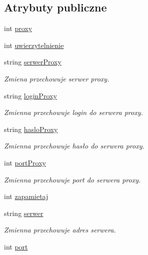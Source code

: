 \subsection*{Atrybuty publiczne}
\begin{CompactItemize}
\item 
int \hyperlink{a00001_2be9fdb760f0ef82c0bfd65a6867c1fb}{proxy}
\item 
int \hyperlink{a00001_4b253df312924aa3a59d44df86116f92}{uwierzytelnienie}
\item 
string \hyperlink{a00001_6d2d31466c2f07ac86fd48ec831f9bb1}{serwerProxy}
\begin{CompactList}\small\item\em Zmiena przechowuje serwer proxy. \item\end{CompactList}\item 
string \hyperlink{a00001_64ace6acc4b86f34c4744c5bbc55c8d2}{loginProxy}
\begin{CompactList}\small\item\em Zmienna przechowuje login do serwera proxy. \item\end{CompactList}\item 
string \hyperlink{a00001_6fe76a3ea40d35657350ad7bf4a376fb}{hasloProxy}
\begin{CompactList}\small\item\em Zmienna przechowuje hasło do serwera proxy. \item\end{CompactList}\item 
int \hyperlink{a00001_98d2c01bd53d8e03e93e3ec3e36cc8a8}{portProxy}
\begin{CompactList}\small\item\em Zmienna przechowuje port do serwera proxy. \item\end{CompactList}\item 
int \hyperlink{a00001_816b1bd9c5c0ed1776d3a5dc6a0c9f63}{zapamietaj}
\item 
string \hyperlink{a00001_acbba17189469119f7fdc4b0581604f3}{serwer}
\begin{CompactList}\small\item\em Zmienna przechowuje adres serwera. \item\end{CompactList}\item 
int \hyperlink{a00001_48becc1fc376804e26b24d008e8eb146}{port}
\end{CompactItemize}
